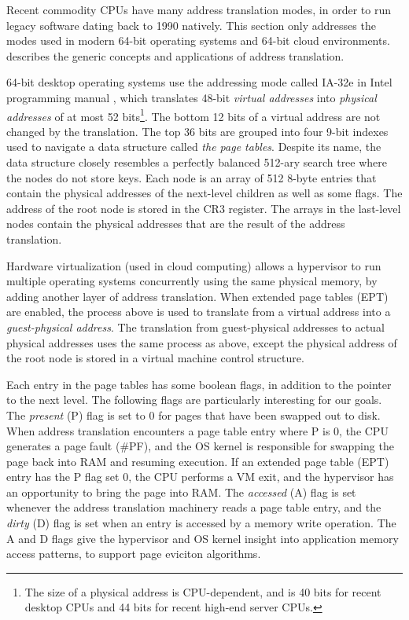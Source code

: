Recent commodity CPUs have many address translation modes, in order to run
legacy software dating back to 1990 natively. This section only addresses the
modes used in modern 64-bit operating systems and 64-bit cloud environments.
\cite{jacob1998virtual} describes the generic concepts and applications of
address translation.

64-bit desktop operating systems use the addressing mode called IA-32e in
Intel programming manual \cite{intel2013manual}, which translates 48-bit
\textit{virtual addresses} into \textit{physical addresses} of at most 52
bits\footnote{The size of a physical address is CPU-dependent, and is 40 bits
for recent desktop CPUs and 44 bits for recent high-end server CPUs.}. The
bottom 12 bits of a virtual address are not changed by the translation. The top
36 bits are grouped into four 9-bit indexes used to navigate a data structure
called \textit{the page tables}. Despite its name, the data structure closely
resembles a perfectly balanced 512-ary search tree where the nodes do not store
keys. Each node is an array of 512 8-byte entries that contain the physical
addresses of the next-level children as well as some flags. The address of the
root node is stored in the CR3 register. The arrays in the last-level nodes
contain the physical addresses that are the result of the address translation.

Hardware virtualization (used in cloud computing) allows a hypervisor to run
multiple operating systems concurrently using the same physical memory, by
adding another layer of address translation. When extended page tables (EPT)
are enabled, the process above is used to translate from a virtual address into
a \textit{guest-physical address}. The translation from guest-physical
addresses to actual physical addresses uses the same process as above, except
the physical address of the root node is stored in a virtual machine control
structure.

Each entry in the page tables has some boolean flags, in addition to the
pointer to the next level. The following flags are particularly interesting for
our goals. The \textit{present} (P) flag is set to 0 for pages that have been
swapped out to disk. When address translation encounters a page table entry
where P is 0, the CPU generates a page fault (\#PF), and the OS kernel is
responsible for swapping the page back into RAM and resuming execution. If
an extended page table (EPT) entry has the P flag set 0, the CPU performs a VM
exit, and the hypervisor has an opportunity to bring the page into RAM. The
\textit{accessed} (A) flag is set whenever the address translation machinery
reads a page table entry, and the \textit{dirty} (D) flag is set when an entry
is accessed by a memory write operation. The A and D flags give the hypervisor
and OS kernel insight into application memory access patterns, to support page
eviciton algorithms.

